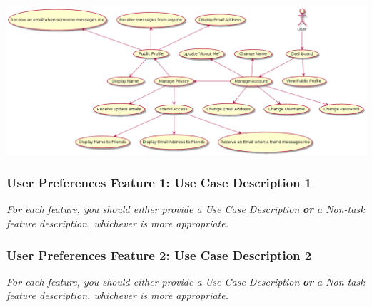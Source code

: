 \documentclass[twoside,letterpaper]{article}
\begin{document}
\bigskip

\includegraphics[width=\textwidth]{images/UseCaseDiagrams/UserPreferences}

\newpage

\subsubsection[User Preferences Feature 1: Use Case Description 1]{\rmfamily\bfseries\color{black}
	User Preferences Feature 1: Use Case Description 1}
\hypertarget{RefHeading22059017292}{}
\bigskip

{\color{black}
	\foreignlanguage{english}{\textit{For each feature, you should either provide a Use Case Description
		}}\foreignlanguage{english}{\textbf{\textit{or}}}\foreignlanguage{english}{\textit{ a Non-task feature description,
		whichever is more appropriate.}}}


\newpage

\subsubsection[User Preferences Feature 2: Use Case Description 2]{\rmfamily\bfseries\color{black}
	User Preferences Feature 2: Use Case Description 2}
\hypertarget{RefHeading22059017292}{}
\bigskip

{\color{black}
	\foreignlanguage{english}{\textit{For each feature, you should either provide a Use Case Description
		}}\foreignlanguage{english}{\textbf{\textit{or}}}\foreignlanguage{english}{\textit{ a Non-task feature description,
		whichever is more appropriate.}}}
\end{document}
